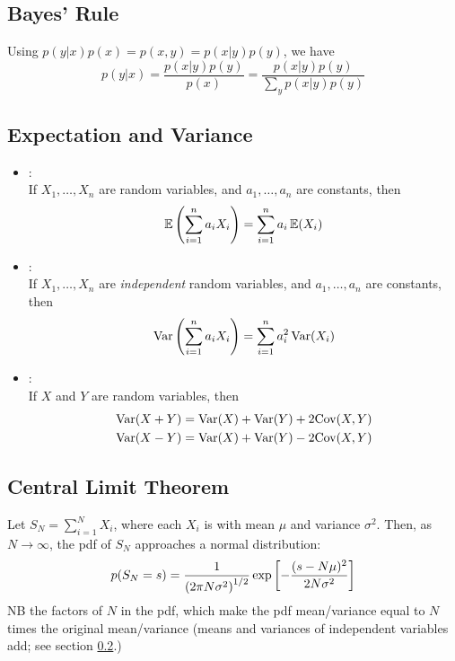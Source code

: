 \documentclass[11pt]{article}
\begin{document}
\subsection{Bayes' Rule}
Using $p(y|x) p(x) = p(x,y) = p(x|y) p(y)$, we have
\begin{equation}
  p(y|x) = \frac{p(x|y) p(y)}{p(x)} = \frac{p(x|y) p(y)}{\sum\limits_y p(x|y) p(y)}
\end{equation}

\subsection{Expectation and Variance}
\label{sec:ExpVar}
\begin{itemize}
  \item {}:\\
  If $X_1, \dots, X_n$ are random variables, and $a_1, \dots, a_n$ are constants, then
  \begin{equation}
    \mathbb{E} \left( \sum_{i=1}^n a_i X_i \right) = \sum_{i=1}^n a_i\, \mathbb{E} (X_i)
  \end{equation}

  \item {}:\\
  If $X_1, \dots, X_n$ are \emph{independent} random variables, and $a_1, \dots, a_n$
  are constants, then
  \begin{equation}
    \textrm{Var} \left( \sum_{i=1}^n a_i X_i \right) = \sum_{i=1}^n a_i^2\, \textrm{Var} (X_i)
  \end{equation}

  \item {}:\\
  If $X$ and $Y$ are random variables, then
  \begin{align}
    \textrm{Var} (X + Y) &= \textrm{Var}(X) + \textrm{Var}(Y) + 2 \textrm{Cov}(X, Y) \nonumber\\
    \textrm{Var} (X - Y) &= \textrm{Var}(X) + \textrm{Var}(Y) - 2 \textrm{Cov}(X, Y)
  \end{align}
  
\end{itemize}

\subsection{Central Limit Theorem}
Let $S_N = \sum_{i=1}^N X_i$, where each $X_i$ is  with mean $\mu$ and variance
$\sigma^2$. Then, as $N \to \infty$, the pdf of $S_N$ approaches a normal distribution:
\begin{equation}
  p(S_N = s) = \frac{1}{\left( 2 \pi N \sigma^2 \right)^{1/2}} \exp \left[ - \frac{(s - N
    \mu)^2}{2 N \sigma^2} \right] 
\end{equation}
NB the factors of $N$ in the pdf, which make the pdf mean/variance equal to $N$ times
the original mean/variance (\eie means and variances of independent variables add; see
section \ref{sec:ExpVar}.)
\end{document}
